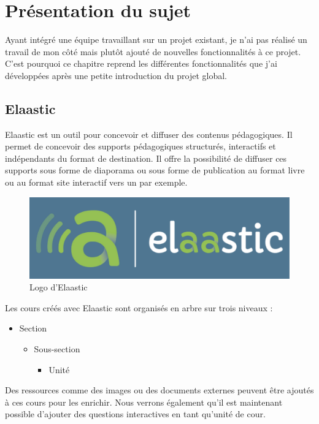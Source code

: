 \chapter{Présentation du sujet}
Ayant intégré une équipe travaillant sur un projet existant, je n'ai pas réalisé
un travail de mon côté mais plutôt ajouté de nouvelles fonctionnalités à ce
projet. C'est pourquoi ce chapitre reprend les différentes fonctionnalités que
j'ai développées après une petite introduction du projet global.

\section{Elaastic}
Elaastic est un outil pour concevoir et diffuser des contenus pédagogiques. Il
permet de concevoir des supports pédagogiques structurés, interactifs et
indépendants du format de destination. Il offre la possibilité de diffuser ces
supports sous forme de diaporama ou sous forme de publication au format livre ou
au format site interactif vers un  par exemple.

\begin{figure}[h]
  \centering
  \includegraphics[scale=0.35]{images/elaastic_blue.pdf}%
  \caption{Logo d'Elaastic}
  \label{fig:elaastic}
\end{figure}

Les cours créés avec Elaastic sont organisés en arbre sur trois niveaux :
\begin{itemize}
  \item Section
	\begin{itemize}
	  \item Sous-section
		\begin{itemize}
		  \item Unité
		\end{itemize}
	\end{itemize}
\end{itemize}

Des ressources comme des images ou des documents externes peuvent être ajoutés à
ces cours pour les enrichir. Nous verrons également qu'il est maintenant
possible d'ajouter des questions interactives en tant qu'unité de cour.\\

